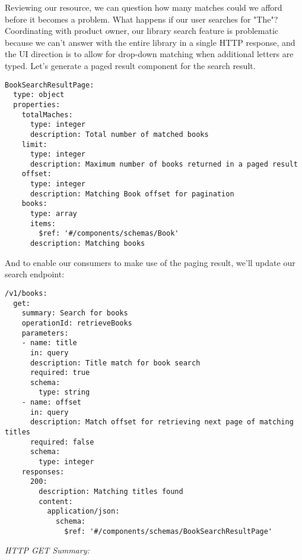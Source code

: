 Reviewing our resource, we can question how many matches could we afford before it becomes a problem.  What happens if our user searches for "The"?  Coordinating with product owner, our library search feature is problematic because we can't answer with the entire library in a single HTTP response, and the UI direction is to allow for drop-down matching when additional letters are typed.  Let's generate a paged result component for the search result.

\begin{minipage}{\linewidth}

\begin{code}
\begin{lstlisting}[belowskip=-\baselineskip]
BookSearchResultPage:
  type: object
  properties:
    totalMaches:
      type: integer
      description: Total number of matched books
    limit:
      type: integer
      description: Maximum number of books returned in a paged result
    offset:
      type: integer
      description: Matching Book offset for pagination
    books:
      type: array
      items:
        $ref: '#/components/schemas/Book'
      description: Matching books
\end{lstlisting}
\end{code}
\end{minipage}


\begin{minipage}{\linewidth}
And to enable our consumers to make use of the paging result, we'll update our search endpoint:

\begin{code}
\begin{lstlisting}[belowskip=-\baselineskip]
/v1/books:
  get:
    summary: Search for books
    operationId: retrieveBooks
    parameters:
    - name: title
      in: query
      description: Title match for book search
      required: true
      schema:
        type: string
    - name: offset
      in: query
      description: Match offset for retrieving next page of matching titles
      required: false
      schema:
        type: integer
    responses:
      200:
        description: Matching titles found
        content:
          application/json:
            schema:
              $ref: '#/components/schemas/BookSearchResultPage'
\end{lstlisting}
\end{code}
\end{minipage}

\emph{HTTP GET Summary:}

